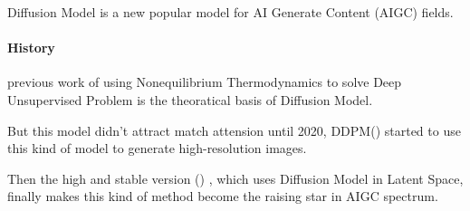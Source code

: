 Diffusion Model is a new popular model for AI Generate Content (AIGC) fields.

\paragraph{History}

previous work of using Nonequilibrium Thermodynamics \cite{sohl-dicksteinDeepUnsupervisedLearning2015} 
to solve Deep Unsupervised Problem is the theoratical basis of Diffusion Model.

But this model didn't attract match attension until 2020, 
DDPM(\cite{hoDenoisingDiffusionProbabilistic2020}) started 
to use this kind of model to generate high-resolution images.

Then the high and stable version (\cite{rombachHighResolutionImageSynthesis2022})
, which uses Diffusion Model in Latent Space, 
finally makes this kind of method become the raising star
in AIGC spectrum.


